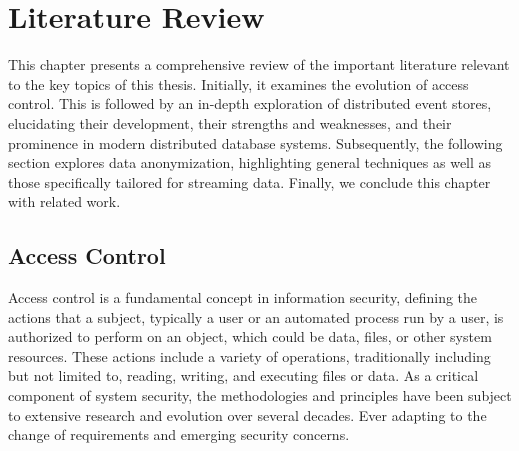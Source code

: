 \chapter{Literature Review\label{cha:chapter2}}
This chapter presents a comprehensive review of the important literature relevant to the key topics of this thesis. Initially, it examines the evolution of access control. This is followed by an in-depth exploration of distributed event stores, elucidating their development, their strengths and weaknesses, and their prominence in modern distributed database systems. Subsequently, the following section explores data anonymization, highlighting general techniques as well as those specifically tailored for streaming data. Finally, we conclude this chapter with related work. 


\section{Access Control\label{sec:rbac}}
Access control is a fundamental concept in information security, defining the actions that a subject, typically a user or an automated process run by a user, is authorized to perform on an object, which could be data, files, or other system resources. These actions include a variety of operations, traditionally including but not limited to, reading, writing, and executing files or data. As a critical component of system security, the methodologies and principles have been subject to extensive research and evolution over several decades. Ever adapting to the change of requirements and emerging security concerns.\par
